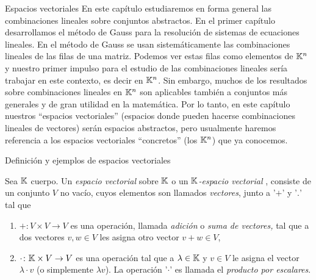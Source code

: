 


    \begin{chapter}{Espacios vectoriales}\label{chap-esp-vect} En este capítulo estudiaremos en forma general las combinaciones lineales sobre conjuntos abstractos.
        En el primer capítulo desarrollamos el método de Gauss para la resolución de sistemas de ecuaciones lineales. En el método de Gauss se usan sistemáticamente las combinaciones lineales de las filas de una matriz. Podemos ver estas filas como elementos de $\mathbb K^n$  y nuestro primer impulso para el estudio de las combinaciones lineales sería trabajar en este contexto, es decir  en $\mathbb K^n$.  Sin embargo, muchos de los resultados sobre combinaciones lineales en $\mathbb K^n$ son aplicables también a conjuntos más generales y de gran utilidad en la matemática. Por lo tanto, en este capítulo nuestros ``espacios vectoriales'' (espacios donde pueden hacerse combinaciones lineales de vectores) serán espacios abstractos, pero usualmente haremos referencia a los espacios vectoriales ``concretos'' (los $\mathbb K^n$) que ya conocemos. 
        
        
        \begin{section}{Definici\'on y ejemplos de espacios vectoriales}\label{seccion-definicion-de-espacios-vectoriales}
            
            \begin{definicion}\label{def-esp-vect} Sea $\mathbb K$ cuerpo. Un \textit{espacio vectorial} sobre $\mathbb K$ o un \textit{$\mathbb K$-espacio vectorial }, consiste de  un  conjunto $V$ no vacío, cuyos elementos son llamados \textit{vectores}, junto a  '$+$' y '$.$' tal que
                \begin{enumerate}[label=\textit{\alph*)}, ref=\textit{\alph*)}]
                    \item $+\colon V\times V\to V$ es una operación, llamada \textit{adición} o  \textit{suma de vectores,} tal que a dos vectores $v,w \in V$ les asigna otro vector $v+w \in V$,
                    \item  $\cdot \colon \mathbb K\times V\to V$ es una operación tal que a $\lambda \in \mathbb K$ y $v \in V$ le asigna el vector $\lambda\cdot v$ (o simplemente $\lambda v$).  La operación '$\cdot$' es llamada  el \textit{producto por escalares}.
                     

\end{enumerate}
\end{definicion}
\end{section}
\end{chapter}
